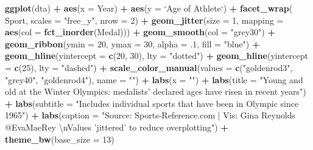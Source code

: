 \documentclass[]{book}
\newenvironment{Shaded}{\begin{snugshade}}{\end{snugshade}}
\newcommand{\KeywordTok}[1]{\textcolor[rgb]{0.13,0.29,0.53}{\textbf{#1}}}
\newcommand{\DataTypeTok}[1]{\textcolor[rgb]{0.13,0.29,0.53}{#1}}
\newcommand{\DecValTok}[1]{\textcolor[rgb]{0.00,0.00,0.81}{#1}}
\newcommand{\CharTok}[1]{\textcolor[rgb]{0.31,0.60,0.02}{#1}}
\newcommand{\StringTok}[1]{\textcolor[rgb]{0.31,0.60,0.02}{#1}}
\newcommand{\OperatorTok}[1]{\textcolor[rgb]{0.81,0.36,0.00}{\textbf{#1}}}
\newcommand{\NormalTok}[1]{#1}
\theoremstyle{definition}
\theoremstyle{definition}
\theoremstyle{definition}
\theoremstyle{remark}
\begin{document}
\begin{Shaded}
\begin{Highlighting}[]
\KeywordTok{ggplot}\NormalTok{(dta) }\OperatorTok{+}
\StringTok{  }\KeywordTok{aes}\NormalTok{(}\DataTypeTok{x =}\NormalTok{ Year) }\OperatorTok{+}
\StringTok{  }\KeywordTok{aes}\NormalTok{(}\DataTypeTok{y =} \StringTok{`}\DataTypeTok{Age of Athlete}\StringTok{`}\NormalTok{) }\OperatorTok{+}
\StringTok{  }\KeywordTok{facet_wrap}\NormalTok{(}\OperatorTok{~}\StringTok{ }\NormalTok{Sport, }\DataTypeTok{scales =} \StringTok{"free_y"}\NormalTok{, }\DataTypeTok{nrow =} \DecValTok{2}\NormalTok{) }\OperatorTok{+}
\StringTok{  }\KeywordTok{geom_jitter}\NormalTok{(}\DataTypeTok{size =} \DecValTok{1}\NormalTok{, }\DataTypeTok{mapping =} \KeywordTok{aes}\NormalTok{(}\DataTypeTok{col =} \KeywordTok{fct_inorder}\NormalTok{(Medal))) }\OperatorTok{+}
\StringTok{  }\KeywordTok{geom_smooth}\NormalTok{(}\DataTypeTok{col =} \StringTok{"grey30"}\NormalTok{) }\OperatorTok{+}
\StringTok{  }\KeywordTok{geom_ribbon}\NormalTok{(}\DataTypeTok{ymin =} \DecValTok{20}\NormalTok{, }\DataTypeTok{ymax =} \DecValTok{30}\NormalTok{, }\DataTypeTok{alpha =}\NormalTok{ .}\DecValTok{1}\NormalTok{, }\DataTypeTok{fill =} \StringTok{"blue"}\NormalTok{) }\OperatorTok{+}
\StringTok{  }\KeywordTok{geom_hline}\NormalTok{(}\DataTypeTok{yintercept =} \KeywordTok{c}\NormalTok{(}\DecValTok{20}\NormalTok{, }\DecValTok{30}\NormalTok{), }\DataTypeTok{lty =} \StringTok{"dotted"}\NormalTok{) }\OperatorTok{+}
\StringTok{  }\KeywordTok{geom_hline}\NormalTok{(}\DataTypeTok{yintercept =} \KeywordTok{c}\NormalTok{(}\DecValTok{25}\NormalTok{), }\DataTypeTok{lty =} \StringTok{"dashed"}\NormalTok{) }\OperatorTok{+}
\StringTok{  }\KeywordTok{scale_color_manual}\NormalTok{(}\DataTypeTok{values =} \KeywordTok{c}\NormalTok{(}\StringTok{"goldenrod3"}\NormalTok{, }\StringTok{"grey40"}\NormalTok{, }\StringTok{"goldenrod4"}\NormalTok{), }\DataTypeTok{name =} \StringTok{""}\NormalTok{) }\OperatorTok{+}
\StringTok{  }\KeywordTok{labs}\NormalTok{(}\DataTypeTok{x =} \StringTok{""}\NormalTok{) }\OperatorTok{+}
\StringTok{  }\KeywordTok{labs}\NormalTok{(}\DataTypeTok{title =} \StringTok{"Young and old at the Winter Olympics: medalists' declared ages have risen in recent years"}\NormalTok{) }\OperatorTok{+}\StringTok{ }
\StringTok{  }\KeywordTok{labs}\NormalTok{(}\DataTypeTok{subtitle =} \StringTok{"Includes individual sports that have been in Olympic since 1965"}\NormalTok{) }\OperatorTok{+}
\StringTok{  }\KeywordTok{labs}\NormalTok{(}\DataTypeTok{caption =} \StringTok{"Source: Sports-Reference.com | Vis: Gina Reynolds @EvaMaeRey }\CharTok{\textbackslash{}n}\StringTok{Values 'jittered' to reduce overplotting"}\NormalTok{) }\OperatorTok{+}
\StringTok{  }\KeywordTok{theme_bw}\NormalTok{(}\DataTypeTok{base_size =} \DecValTok{13}\NormalTok{)}
\end{Highlighting}
\end{Shaded}
\end{document}
